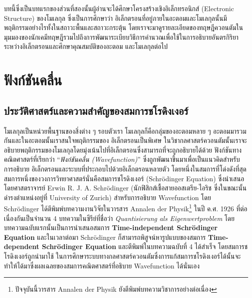 บทนี้ซึ่งเป็นบทแรกของส่วนที่สองนั้นผู้อ่านจะได้ศึกษาโครงสร้างเชิงอิเล็กทรอนิกส์ (Electronic Structure) ของโมเลกุล ซึ่งเป็นการศึกษาว่า%
อิเล็กตรอนที่อยู่ภายในอะตอมและโมเลกุลนั้นมีพฤติกรรมอย่างไรทั้งในสถาวะพื้นและสถาวะกระตุ้น โดยเราจะมาดูรายละเอียดของทฤษฎีควอนตัมใน%
มุมมองของนักเคมีทฤษฎีรวมไปถึงการพัฒนาระเบียบวิธีการคำนวณเพื่อใช้ในการอธิบายอันตรกิริยาระหว่างอิเล็กตรอนและศึกษาคุณสมบัติของอะตอม%
และโมเลกุลต่อไป

\section{ฟังก์ชันคลื่น}
\label{sec:wavefunction}

\subsection{ประวัติศาสตร์และความสำคัญของสมการชโรดิงเงอร์}
\label{ssec:schrodinger_eq}

โมเลกุลเป็นหน่วยพื้นฐานของสิ่งต่าง ๆ รอบตัวเรา โมเลกุลก็คือกลุ่มของอะตอมหลาย ๆ อะตอมมารวมกันและในอะตอมนั้นเราสนใจพฤติกรรมของ%
อิเล็กตรอนเป็นพิเศษ ในวิชากลศาสตร์ควอนตัมนั้นเราจะอธิบายพฤติกรรมของโมเลกุลโดยมุ่งเน้นไปที่อิเล็กตรอนซึ่งสามารถที่จะถูกอธิบายได้ด้วย%
ฟังก์ชันทางคณิตศาสตร์ที่เรียกว่า \enquote{\textit{ฟังก์ชันคลื่น (Wavefunction)}} ซึ่งถูกพัฒนาขึ้นมาเพื่อเป็นแนวคิดสำหรับการอธิบาย%
อิเล็กตรอนและระบบที่ประกอบไปด้วยอิเล็กตรอนหลายตัว โดยหนึ่งในสมการที่โด่งดังที่สุดสมการหนึ่งของวงการวิทยาศาสตร์นั่นคือสมการชโรดิงเงอร์
(Schr\"{o}dinger Equation)\autocite{schleich2013} ซึ่งนำเสนอโดยศาสตราจารย์ Erwin R. J. A. Schr\"{o}dinger
(นักฟิสิกส์เชื้อสายออสเตรีย-ไอริช ซึ่งในขณะนั้นดำรงตำแหน่งอยู่ที่ University of Zurich) สำหรับการอธิบาย Wavefunction
โดย Schr\"{o}dinger ได้ตีพิมพ์บทความงานวิจัยในวารสาร Annalen der Physik\footnote{ปัจจุบันนี้วารสาร Annalen der Physik
    ยังตีพิมพ์บทความวิชาการอย่างต่อเนื่อง} ในปี ค.ศ. 1926 ที่ต่อเนื่องกันเป็นจำนวน 4 บทความในซีรีย์ที่ชื่อว่า \textit{Quantisierung als
    Eigenwertproblem} โดยบทความฉบับแรกนั้นเป็นการนำเสนอสมการ \textbf{Time-independent Schr\"{o}dinger Equation}%
\autocite{schrodinger1926} และในเวลาต่อมา Schr\"{o}dinger ก็สามารถพิสูจน์หารูปแบบของสมการ \textbf{Time-dependent
Schr\"{o}dinger Equation} และตีพิมพ์ในบทความฉบับที่ 4 ได้สำเร็จ\autocite{schrodinger1926a} โดยสมการชโรดิงเงอร์ถูกนำมาใช้%
ในการศึกษาระบบทางกลศาสตร์ควอนตัมซึ่งการแก้สมการชโรดิงเงอร์ได้นั้นจะทำให้ได้มาซึ่งผลเฉลยของสมการคณิตศาสตร์ที่อธิบาย Wavefunction
ได้นั่นเอง

